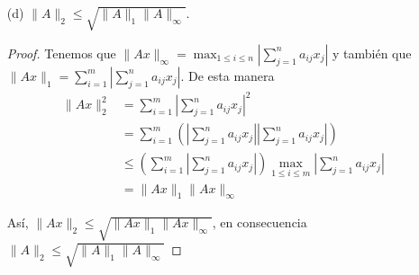 \begin{enumerate}
\begin{proof}
    \end{proof}
    \item[(d)] $\|A\|_2 \leq \sqrt{\|A\|_1 \|A\|_\infty}.$
    \begin{proof}
    Tenemos que $\|Ax\|_\infty = \max_{1 \leq i \leq n}{\left|\sum_{j=1}^{n}a_{ij}x_j\right|}$ y también que $\|Ax\|_1 = \sum_{i=1}^m\left|\sum_{j=1}^{n}a_{ij}x_{j}\right|$. De esta manera
    \begin{align*}
    \|Ax\|_2^2 & = \sum_{i=1}^m\left|\sum_{j=1}^{n}a_{ij}x_{j}\right|^2 \\ 
    & = \sum_{i=1}^m\left(\left|\sum_{j=1}^{n}a_{ij}x_{j}\right|\left|\sum_{j=1}^{n}a_{ij}x_{j}\right|\right) \\ 
    &\leq \left(\sum_{i=1}^m\left|\sum_{j=1}^{n}a_{ij}x_{j}\right|\right)\max_{1\leq i \leq m}{\left|\sum_{j=1}^{n}a_{ij}x_{j}\right|} \\ 
    & = \|Ax\|_1 \|Ax\|_\infty
    \end{align*}

    Así, $\|Ax\|_2\leq \sqrt{\|Ax\|_1 \|Ax\|_\infty}$, en consecuencia $\|A\|_2 \leq \sqrt{\|A\|_1 \|A\|_\infty}$
    \end{proof}
\end{enumerate}